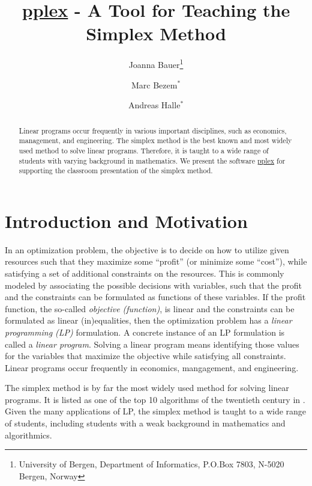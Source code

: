 \documentclass[ukenglish]{nik}
\begin{document}
\title{\url{pplex} - A Tool for Teaching the Simplex Method}

\author{
Joanna Bauer\thanks{University of Bergen, Department of Informatics, P.O.Box 7803, N-5020 Bergen, Norway}
\and
Marc Bezem$^*$
\and
Andreas Halle$^*$}

\maketitle

\begin{abstract}
Linear programs occur frequently in various important disciplines, such as economics, management, and engineering.
The simplex method is the best known and most widely used method to solve linear programs.
Therefore, it is taught to a wide range of students with varying background in mathematics.
We present the software \url{pplex} for supporting
the classroom presentation of the simplex method.
\end{abstract}

\section{Introduction and Motivation}\label{sec:intro}
In an optimization problem, the objective is to decide on how to utilize given resources such that they maximize some ``profit'' (or minimize some ``cost''), while satisfying a set of additional constraints on the resources.
This is commonly modeled by associating the possible decisions with variables, such that the profit and the constraints can be formulated as functions of these variables. 
If the profit function, the so-called \emph{objective (function)}, is linear and the constraints can be formulated as linear (in)equalities, then the optimization problem has a \emph{linear programming (LP)} formulation. A concrete instance of an LP formulation is called a \emph{linear program}.
Solving a linear program means identifying those values for the variables that maximize the objective while satisfying all constraints.
Linear programs occur frequently in economics, mangagement, and engineering.

The simplex method is by far the most widely used method for solving linear programs. 
It is listed as one of the top 10 algorithms of the twentieth century in
\cite{CiSaE2000}. Given the many applications of LP, the simplex method is taught to a wide range of
students, including students with a weak background in mathematics and algorithmics. 
\end{document}

